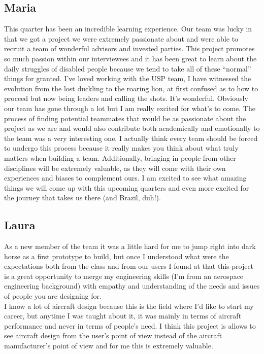 \subsection{Maria}
This quarter has been an incredible learning experience. Our team was lucky in that we got a project we were extremely passionate about and were able to recruit a team of wonderful advisors and invested parties. This project promotes so much passion within our interviewees and it has been great to learn about the daily struggles of disabled people because we tend to take all of these “normal” things for granted. I’ve loved working with the USP team, I have witnessed the evolution from the lost duckling to the roaring lion, at first confused as to how to proceed but now being leaders and calling the shots. It’s wonderful. Obviously our team has gone through a lot but I am really excited for what’s to come. The process of finding potential teammates that would be as passionate about the project as we are and would also contribute both academically and emotionally to the team was a very interesting one. I actually think every team should be forced to undergo this process because it really makes you think about what truly matters when building a team. Additionally, bringing in people from other disciplines will be extremely valuable, as they will come with their own experiences and biases to complement ours. I am excited to see what amazing things we will come up with this upcoming quarters and even more excited for the journey that takes us there (and Brazil, duh!).

\subsection{Laura}
As a new member of the team it was a little hard for me to jump right into dark horse as a first prototype to build, but once I understood what were the expectations both from the class and from our users I found at that this project is a great opportunity to merge my engineering skills (I’m from an aerospace engineering background) with empathy and understanding of the needs and issues of people you are designing for. \\

I know a lot of aircraft design because this is the field where I’d like to start my career, but anytime I was taught about it, it was mainly in terms of aircraft performance and never in terms of people’s need. I think this project is allows to see aircraft design from the user’s point of view instead of the aircraft manufacturer’s point of view and for me this is extremely valuable. \\

